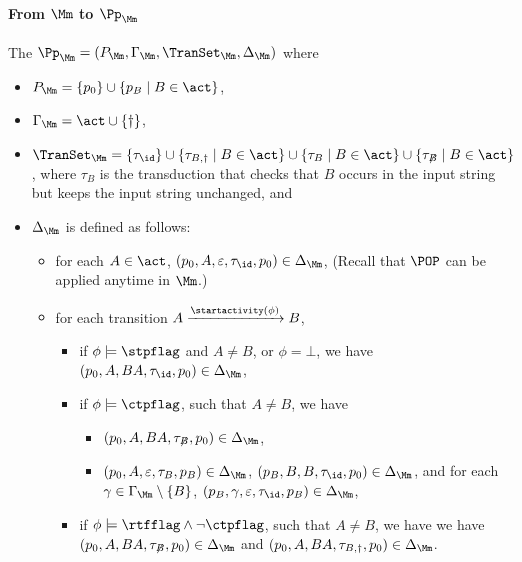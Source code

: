 \paragraph*{From $\Mm$ to $\Pp_\Mm$} 
The {\WOTrPDS} $\Pp_\Mm = (P_\Mm, \Gamma_\Mm, \TranSet_\Mm, \Delta_\Mm)$ where 
\begin{itemize}
\item $P_{\Mm} = \{p_0\}\cup\{ p_{B}\mid B\in\act\}$,
\item $\Gamma_{\Mm} = \act \cup \{\dag\}$, 
\item $\TranSet_\Mm = \{\tau_{\id} \}\cup \{\tau_{B, \dag} \mid B \in \act\} \cup \{\tau_{B} \mid B \in \act\}  \cup \{\tau_{\not B} \mid B \in \act\}$, where $\tau_B$ is the transduction that checks that $B$ occurs in the input string but keeps the input string unchanged, and 
\item $\Delta_{\Mm}$ is defined as follows:
        \begin{itemize}
            \item for each $A \in \act$, $(p_0, A, \varepsilon, \tau_{\id}, p_0) \in \Delta_{\Mm}$, (Recall that $\POP$ can be applied anytime in $\Mm$.)
			\item for each transition $A\xrightarrow{\startactivity(\phi)}B$, 
			\begin{itemize}
				\item if $\phi\models\stpflag$ and $A\neq B$, or $\phi=\bot$, we have $(p_0, A, BA, \tau_{\id}, p_0) \in \Delta_{\Mm}$, 
				\item if $\phi\models\ctpflag$, such that $A\neq B$, we have 
				\begin{itemize}
					\item $(p_0, A, BA, \tau_{\not B}, p_0) \in \Delta_{\Mm}$, 
					\item $(p_0, A, \varepsilon, \tau_{B}, p_B) \in \Delta_{\Mm}$, $(p_B, B, B, \tau_{\id}, p_0)  \in \Delta_{\Mm}$, and for each $\gamma \in \Gamma_\Mm \setminus \{B\}$, $(p_B, \gamma, \varepsilon, \tau_{\id}, p_B) \in \Delta_{\Mm}$, 
				\end{itemize}
				\item if $\phi\models\rtfflag\wedge\neg\ctpflag$, such that $A\neq B$, we have 
                we have $(p_0, A, BA, \tau_{\not B}, p_0) \in \Delta_{\Mm}$ 
                and $(p_0, A, BA, \tau_{B, \dag}, p_0) \in \Delta_{\Mm}$.
			\end{itemize}
        \end{itemize}
\end{itemize}



